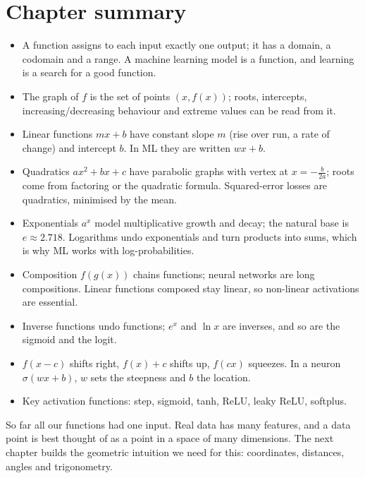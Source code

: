 \section{Chapter summary}\label{sec:ch2-summary}

\begin{keytakeaways}
\begin{itemize}
  \item A function assigns to each input exactly one output; it has a domain,
    a codomain and a range. A machine learning model is a function, and
    learning is a search for a good function.
  \item The graph of $f$ is the set of points $(x, f(x))$; roots, intercepts,
    increasing/decreasing behaviour and extreme values can be read from it.
  \item Linear functions $mx + b$ have constant slope $m$ (rise over run, a rate
    of change) and intercept $b$. In ML they are written $wx + b$.
  \item Quadratics $ax^2 + bx + c$ have parabolic graphs with vertex at
    $x = -\frac{b}{2a}$; roots come from factoring or the quadratic formula.
    Squared-error losses are quadratics, minimised by the mean.
  \item Exponentials $a^x$ model multiplicative growth and decay; the natural
    base is $e \approx 2.718$. Logarithms undo exponentials and turn products
    into sums, which is why ML works with log-probabilities.
  \item Composition $f(g(x))$ chains functions; neural networks are long
    compositions. Linear functions composed stay linear, so non-linear
    activations are essential.
  \item Inverse functions undo functions; $e^x$ and $\ln x$ are inverses, and
    so are the sigmoid and the logit.
  \item $f(x - c)$ shifts right, $f(x) + c$ shifts up, $f(cx)$ squeezes. In a
    neuron $\sigma(wx + b)$, $w$ sets the steepness and $b$ the location.
  \item Key activation functions: step, sigmoid, tanh, ReLU, leaky ReLU,
    softplus.
\end{itemize}
\end{keytakeaways}

So far all our functions had one input. Real data has many features, and a
data point is best thought of as a point in a space of many dimensions. The
next chapter builds the geometric intuition we need for this: coordinates,
distances, angles and trigonometry.
